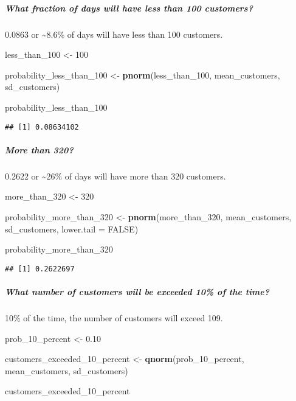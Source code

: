 \documentclass[
]{article}
\newenvironment{Shaded}{\begin{snugshade}}{\end{snugshade}}
\newcommand{\AttributeTok}[1]{\textcolor[rgb]{0.13,0.29,0.53}{#1}}
\newcommand{\ConstantTok}[1]{\textcolor[rgb]{0.56,0.35,0.01}{#1}}
\newcommand{\DecValTok}[1]{\textcolor[rgb]{0.00,0.00,0.81}{#1}}
\newcommand{\FloatTok}[1]{\textcolor[rgb]{0.00,0.00,0.81}{#1}}
\newcommand{\FunctionTok}[1]{\textcolor[rgb]{0.13,0.29,0.53}{\textbf{#1}}}
\newcommand{\NormalTok}[1]{#1}
\newcommand{\OtherTok}[1]{\textcolor[rgb]{0.56,0.35,0.01}{#1}}
\begin{document}
\hypertarget{what-fraction-of-days-will-have-less-than-100-customers}{%
\subparagraph{What fraction of days will have less than 100
customers?}\label{what-fraction-of-days-will-have-less-than-100-customers}}

0.0863 or \textasciitilde8.6\% of days will have less than 100
customers.

\begin{Shaded}
\begin{Highlighting}[]
\NormalTok{less\_than\_100 }\OtherTok{\textless{}{-}} \DecValTok{100}

\NormalTok{probability\_less\_than\_100 }\OtherTok{\textless{}{-}} \FunctionTok{pnorm}\NormalTok{(less\_than\_100, mean\_customers, sd\_customers)}


\NormalTok{probability\_less\_than\_100}
\end{Highlighting}
\end{Shaded}

\begin{verbatim}
## [1] 0.08634102
\end{verbatim}

\hypertarget{more-than-320}{%
\subparagraph{More than 320?}\label{more-than-320}}

0.2622 or \textasciitilde26\% of days will have more than 320 customers.

\begin{Shaded}
\begin{Highlighting}[]
\NormalTok{more\_than\_320 }\OtherTok{\textless{}{-}} \DecValTok{320}

\NormalTok{probability\_more\_than\_320 }\OtherTok{\textless{}{-}} \FunctionTok{pnorm}\NormalTok{(more\_than\_320, mean\_customers, sd\_customers, }\AttributeTok{lower.tail =} \ConstantTok{FALSE}\NormalTok{) }

\NormalTok{probability\_more\_than\_320}
\end{Highlighting}
\end{Shaded}

\begin{verbatim}
## [1] 0.2622697
\end{verbatim}

\hypertarget{what-number-of-customers-will-be-exceeded-10-of-the-time}{%
\subparagraph{What number of customers will be exceeded 10\% of the
time?}\label{what-number-of-customers-will-be-exceeded-10-of-the-time}}

10\% of the time, the number of customers will exceed 109.

\begin{Shaded}
\begin{Highlighting}[]
\NormalTok{prob\_10\_percent }\OtherTok{\textless{}{-}} \FloatTok{0.10}

\NormalTok{customers\_exceeded\_10\_percent }\OtherTok{\textless{}{-}} \FunctionTok{qnorm}\NormalTok{(prob\_10\_percent, mean\_customers, sd\_customers)}

\NormalTok{customers\_exceeded\_10\_percent}
\end{Highlighting}
\end{Shaded}
\end{document}
